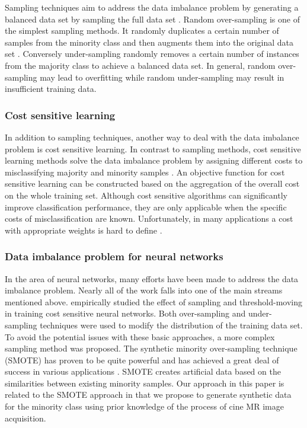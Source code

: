 \documentclass[preprint,12pt,authoryear]{elsarticle}
\begin{document}
Sampling techniques aim to address the data imbalance problem by generating a balanced data set by sampling the full data set
\citep{Estabrooks2004}. Random over-sampling is one of the simplest sampling methods. It randomly duplicates a certain number of samples from the minority class and then augments them into the original data set \citep{Han2005}. Conversely under-sampling randomly removes a certain number of instances from the majority class to achieve a balanced data set. In general, random over-sampling may lead to overfitting while random under-sampling may result in insufficient training data.



\subsubsection{Cost sensitive learning}

In addition to sampling techniques, another way to deal with the data imbalance problem is cost sensitive learning. In contrast to sampling methods, cost sensitive learning methods solve the data imbalance problem by assigning different costs to misclassifying majority and minority samples \citep{Khan2018}. An objective function for cost sensitive learning can be constructed based on the aggregation of the overall cost on the whole training set.
Although cost sensitive algorithms can significantly improve classification performance, they are only applicable when the specific costs of misclassification are known. Unfortunately, in many applications a cost with appropriate weights is hard  to define \citep{Maloof2003}.

\subsubsection{Data imbalance problem for neural networks}

In the area of neural networks, many efforts have been made  to address the data imbalance problem. Nearly all of the work falls into one of the main streams mentioned above.
\cite{Zhou2006} empirically studied the effect of sampling and threshold-moving in training cost sensitive  neural  networks. Both over-sampling  and  under-sampling techniques were used to modify the distribution of the training  data  set. To avoid the potential issues with these basic approaches, a more complex sampling method was proposed. The synthetic minority over-sampling technique (SMOTE) has proven to be quite powerful and has achieved a great deal of success in various applications \citep{Han2005}. SMOTE creates artificial data based on the similarities between existing minority samples.
Our approach in this paper is related to the SMOTE approach in that we propose to generate synthetic data for the minority class using prior knowledge of the process of cine MR image acquisition.
\end{document}
